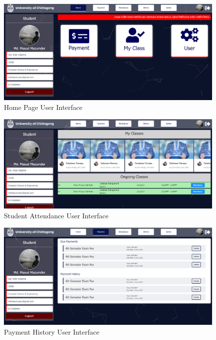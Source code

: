 \begin{figure}[H]
	\includegraphics[width=1\textwidth]{images/home}
	\caption{Home Page User Interface}
\end{figure}
\begin{figure}[H]
	\includegraphics[width=1\textwidth]{images/stu_att}
	\caption{Student Attendance User Interface}
\end{figure}
\begin{figure}[H]
	\includegraphics[width=1\textwidth]{images/payhistory}
	\caption{Payment History User Interface}
\end{figure}
